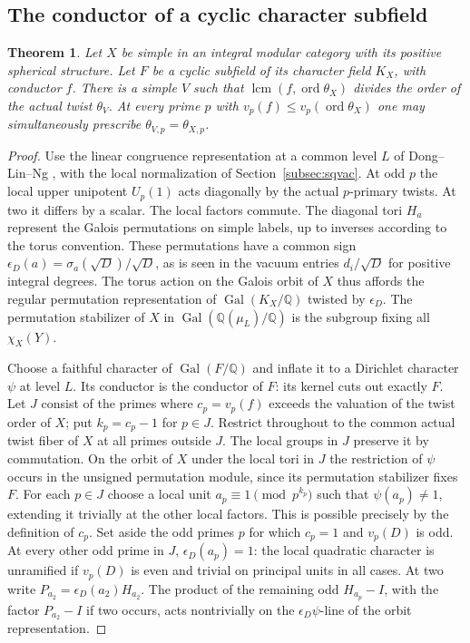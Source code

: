 \documentclass[11pt,a4paper]{article}
\numberwithin{equation}{section}
\newtheorem{theorem}{Theorem}[section]
\theoremstyle{remark}
\newcommand{\QQ}{\mathbb Q}
\begin{document}
\subsection{The conductor of a cyclic character subfield}\label{found:C:7}
\begin{theorem}\label{found:C:7.1}\label{found:C:key:new:single-twist}
Let $X$ be simple in an integral modular category with its positive
spherical structure. Let $F$ be a cyclic subfield of its character
field $K_X$, with conductor $f$. There is a simple $V$ such that
$\operatorname{lcm}(f,\operatorname{ord}\theta_X)$ divides the order
of the actual twist $\theta_V$. At every prime $p$ with
$v_p(f)\le v_p(\operatorname{ord}\theta_X)$ one may simultaneously
prescribe $\theta_{V,p}=\theta_{X,p}$.
\end{theorem}
\begin{proof}
Use the linear congruence representation at a common level $L$ of Dong--Lin--Ng \cite[Theorem~II]{DLNCongruence}, with the local normalization of Section~\ref{subsec:sqvac}. At odd $p$ the local upper unipotent
$U_p(1)$ acts diagonally by the actual $p$-primary twists. At two
it differs by a scalar. The local factors commute. The diagonal
tori $H_a$ represent the Galois permutations on simple labels,
up to inverses according to the torus convention. These permutations
have a common sign $\epsilon_D(a)=\sigma_a(\sqrt D)/\sqrt D$,
as is seen in the vacuum entries $d_i/\sqrt D$ for positive integral
degrees. The torus action on the Galois orbit of $X$ thus affords
the regular permutation representation of $\operatorname{Gal}(K_X/\QQ)$
twisted by $\epsilon_D$. The permutation stabilizer of $X$ in
$\operatorname{Gal}(\QQ(\mu_L)/\QQ)$ is the subgroup fixing all
$\chi_X(Y)$.

Choose a faithful character of $\operatorname{Gal}(F/\QQ)$ and
inflate it to a Dirichlet character $\psi$ at level $L$. Its conductor
is the conductor of $F$: its kernel cuts out exactly $F$.
Let $J$ consist of the primes where $c_p=v_p(f)$ exceeds the
valuation of the twist order of $X$; put $k_p=c_p-1$ for $p\in J$.
Restrict throughout to the common actual twist fiber of $X$ at all
primes outside $J$. The local groups in $J$ preserve it by
commutation. On the orbit of $X$ under the local tori in $J$ the
restriction of $\psi$ occurs in the unsigned permutation module, since
its permutation stabilizer fixes $F$. For each $p\in J$
choose a local unit $a_p\equiv1\pmod {p^{k_p}}$
such that $\psi(a_p)\ne1$, extending it trivially at the other local
factors. This is possible precisely by the definition of $c_p$.
Set aside the odd primes $p$ for which $c_p=1$ and $v_p(D)$ is odd.
At every other odd prime in $J$, $\epsilon_D(a_p)=1$:
the local quadratic character is unramified if $v_p(D)$ is even
and trivial on principal units in all cases. At two write
$P_{a_2}=\epsilon_D(a_2)H_{a_2}$. The product of the remaining
odd $H_{a_p}-I$, with the factor $P_{a_2}-I$ if two occurs,
acts nontrivially on the $\epsilon_D\psi$-line of the orbit representation.


\end{proof}
\end{document}
